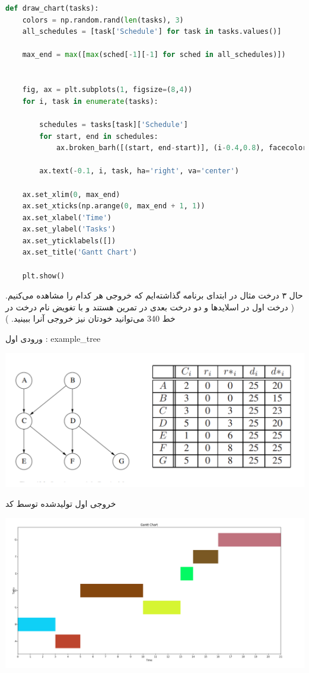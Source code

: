 \begin{latin}
    \begin{lstlisting}[language=python,style=mystyle]
def draw_chart(tasks):
    colors = np.random.rand(len(tasks), 3)
    all_schedules = [task['Schedule'] for task in tasks.values()]

    max_end = max([max(sched[-1][-1] for sched in all_schedules)])


    fig, ax = plt.subplots(1, figsize=(8,4))
    for i, task in enumerate(tasks):
        
        schedules = tasks[task]['Schedule']
        for start, end in schedules:
            ax.broken_barh([(start, end-start)], (i-0.4,0.8), facecolors=colors[i])
            
        ax.text(-0.1, i, task, ha='right', va='center')

    ax.set_xlim(0, max_end)
    ax.set_xticks(np.arange(0, max_end + 1, 1))
    ax.set_xlabel('Time')
    ax.set_ylabel('Tasks')
    ax.set_yticklabels([])
    ax.set_title('Gantt Chart')

    plt.show()
    \end{lstlisting}
\end{latin}

حال ۳ درخت مثال در ابتدای برنامه گذاشته‌ایم که خروجی هر کدام را مشاهده می‌کنیم. (
    درخت اول در اسلایدها و دو درخت بعدی در تمرین 
    هستند و با تغویض نام درخت در خط 340 می‌توانید خودتان نیز خروجی آنرا ببینید.
)

ورودی اول : example\_tree

\includegraphics[scale=0.17]{pics/input1.png}

خروجی اول تولیدشده توسط کد 

\includegraphics[scale=0.3]{pics/output1.png}

